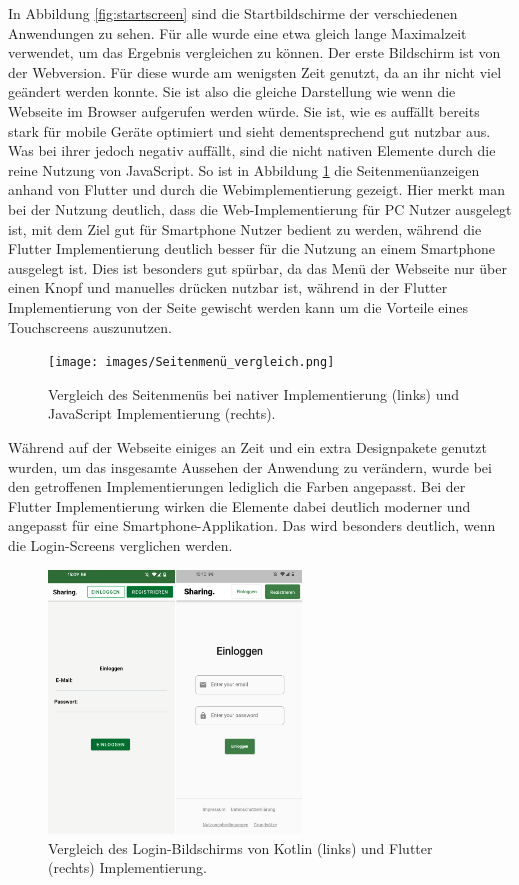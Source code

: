 In Abbildung \ref{fig:startscreen} sind die Startbildschirme der verschiedenen Anwendungen zu sehen. Für alle wurde eine etwa gleich lange Maximalzeit verwendet, um das Ergebnis vergleichen zu können. Der erste Bildschirm ist von der Webversion. Für diese wurde am wenigsten Zeit genutzt, da an ihr nicht viel geändert werden konnte. Sie ist also die gleiche Darstellung wie wenn die Webseite im Browser aufgerufen werden würde.  Sie ist, wie es auffällt bereits stark für mobile Geräte optimiert und sieht dementsprechend gut nutzbar aus. Was bei ihrer jedoch negativ auffällt, sind die nicht nativen Elemente durch die reine Nutzung von JavaScript.
So ist in Abbildung \ref{fig:sidemenu} die Seitenmenüanzeigen anhand von Flutter und durch die Webimplementierung gezeigt. Hier merkt man bei der Nutzung deutlich, dass die Web-Implementierung für PC Nutzer ausgelegt ist, mit dem Ziel gut für Smartphone Nutzer bedient zu werden, während die Flutter Implementierung deutlich besser für die Nutzung an einem Smartphone ausgelegt ist. Dies ist besonders gut spürbar, da das Menü der Webseite nur über einen Knopf und manuelles drücken nutzbar ist, während in der Flutter Implementierung von der Seite gewischt werden kann um die Vorteile eines Touchscreens auszunutzen.

\begin{figure}[ht]
  \centering
  \texttt{[image: images/Seitenmenü\_vergleich.png]} 
  \caption[Vergleich des Seitenmenüs der nativen und hybriden Applikation]{Vergleich des Seitenmenüs bei nativer Implementierung (links) und JavaScript Implementierung (rechts).}
  \label{fig:sidemenu}
\end{figure}

Während auf der Webseite einiges an Zeit und ein extra Designpakete genutzt wurden, um das insgesamte Aussehen der Anwendung zu verändern, wurde bei den getroffenen Implementierungen lediglich die Farben angepasst. Bei der Flutter Implementierung wirken die Elemente dabei deutlich moderner und angepasst für eine Smartphone-Applikation. Das wird besonders deutlich, wenn die Login-Screens verglichen werden.

\begin{figure}[ht]
  \centering
  \includegraphics[height=7cm,keepaspectratio]{images/Login_vergleich.png} 
  \caption[Vergleich des Login-Bildschirms von Kotlin und Flutter Implementierung.]{Vergleich des Login-Bildschirms von Kotlin (links) und Flutter (rechts) Implementierung.}
  \label{fig:loginscreen}
\end{figure}

